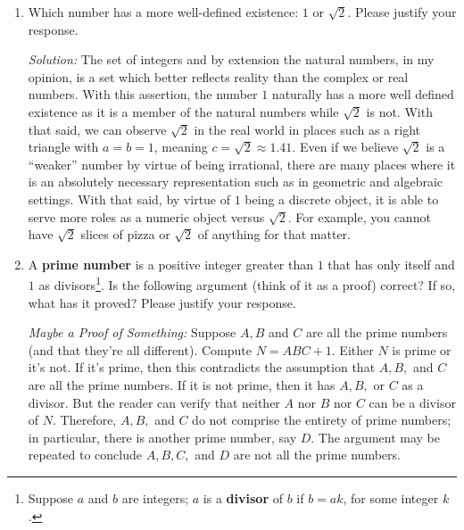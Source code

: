\documentclass[10pt]{article}
\newcommand{\solution}{\color{blue}\textit{Solution:} \color{black} }
\begin{document}
\begin{enumerate}
Beyond this, mathematics often introduces ideas/concepts where applications are not known upon inception, but these ideas are built on the foundation of existing mathematics and are invented as extensions of existing formalisms by the mathematician. 
	
		\item Which number has a more well-defined existence: $1$ or $\sqrt{2}$.
		Please justify your response.
		
\solution The set of integers and by extension the natural numbers, in my opinion, is a set which better
reflects reality than the complex or real numbers. With this assertion, the number $1$ naturally has a more
well defined existence as it is a member of the natural numbers while $\sqrt{2}$ is not. With that said, we can
observe $\sqrt{2}$ in the real world in places such as a right triangle with $a = b = 1$, meaning $c = \sqrt{2} \approx 1.41$.
Even if we believe $\sqrt{2}$ is a ``weaker'' number by virtue of being irrational, there are many places where it
is an absolutely necessary representation such as in geometric and algebraic settings. With that said, by
virtue of $1$ being a discrete object, it is able to serve more roles as a numeric object versus $\sqrt{2}$. For example,
you cannot have $\sqrt{2}$ slices of pizza or $\sqrt{2}$ of anything for that matter.



		\item A {\bf prime number} is a positive integer greater than $1$ that has only itself and $1$ as divisors\footnote{Suppose $a$ and $b$ are integers; $a$ is a {\bf divisor} of $b$ if $b = ak$, for some integer $k$.}.  
		Is the following argument (think of it as a proof) correct?  If so, what has it proved?  
		Please justify your response.
		
		\emph{Maybe a Proof of Something:} Suppose $A,B$ and $C$ are all the prime numbers (and that they're all different).  
		Compute $N = ABC+1$. Either $N$ is prime or it's not.  
		If it's prime, then this contradicts the assumption that $A,B,$ and $C$ are all the prime numbers. 
		If it is not prime, then it has $A,B,$ or $C$ as a divisor. 
		But the reader can verify that neither $A$ nor $B$ nor $C$ can be a divisor of $N$.
		Therefore, $A,B,$ and $C$ do not comprise the entirety of prime numbers; in particular, there is another prime number, say $D$. 
		The argument may be repeated to conclude $A,B,C,$ and $D$ are not all the prime numbers.\\
		

\end{enumerate}
\end{document}
